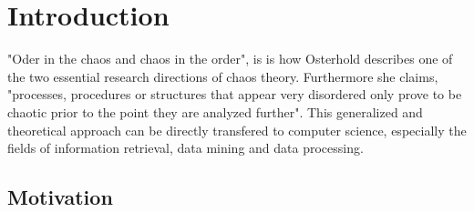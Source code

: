\chapter{Introduction\label{cha:chapter1}}

"Oder in the chaos and chaos in the order", is is how Osterhold\cite[p. 24f]{osterhold_2013} describes one of the two essential research directions of chaos theory. Furthermore she claims, "processes, procedures or structures that appear very disordered only prove to be chaotic prior to the point they are analyzed further". This generalized and theoretical approach can be directly transfered to computer science, especially the fields of information retrieval, data mining and data processing. 

\section{Motivation\label{sec:moti}}

